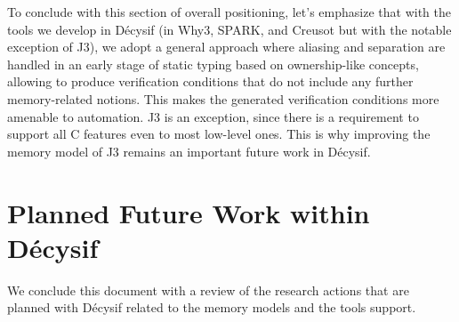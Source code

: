 \documentclass[a4paper,11pt]{article}
\begin{document}
To conclude with this section of overall positioning, let's emphasize that with
the tools we develop in Décysif (in Why3, SPARK, and Creusot but with the notable
exception of J3), we adopt a general approach where aliasing and separation are
handled in an early stage of static typing based on ownership-like concepts,
allowing to produce verification conditions that do not include any further
memory-related notions. This makes the generated verification conditions more
amenable to automation. J3 is an exception, since there is a requirement to support all
C features even to most low-level ones. This is why improving the memory model
of J3 remains an important future work in Décysif.

\section{Planned Future Work within Décysif}
\label{sec:future}

We conclude this document with a review of the research actions that are planned
with Décysif related to the memory models and the tools support.
\end{document}
